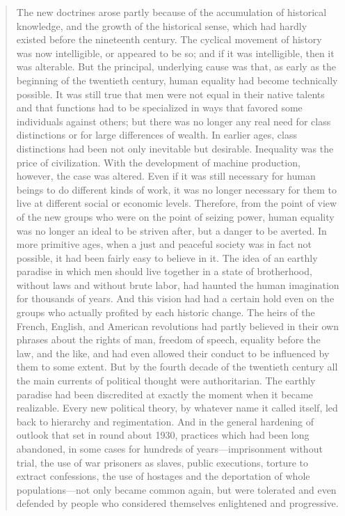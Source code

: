\begin{paracol}{2}
\begin{quotation}
The new doctrines arose partly because of the accumulation of historical
knowledge, and the growth of the historical sense, which had hardly
existed before the nineteenth century. The cyclical movement of history
was now intelligible, or appeared to be so; and if it was intelligible,
then it was alterable. But the principal, underlying cause was that, as
early as the beginning of the twentieth century, human equality had
become technically possible. It was still true that men were not equal
in their native talents and that functions had to be specialized in ways
that favored some individuals against others; but there was no longer
any real need for class distinctions or for large differences of wealth.
In earlier ages, class distinctions had been not only inevitable but
desirable. Inequality was the price of civilization. With the
development of machine production, however, the case was altered. Even
if it was still necessary for human beings to do different kinds of
work, it was no longer necessary for them to live at different social or
economic levels. Therefore, from the point of view of the new groups who
were on the point of seizing power, human equality was no longer an
ideal to be striven after, but a danger to be averted. In more primitive
ages, when a just and peaceful society was in fact not possible, it had
been fairly easy to believe in it. The idea of an earthly paradise in
which men should live together in a state of brotherhood, without laws
and without brute labor, had haunted the human imagination for thousands
of years. And this vision had had a certain hold even on the groups who
actually profited by each historic change. The heirs of the French,
English, and American revolutions had partly believed in their own
phrases about the rights of man, freedom of speech, equality before the
law, and the like, and had even allowed their conduct to be influenced
by them to some extent. But by the fourth decade of the twentieth
century all the main currents of political thought were authoritarian.
The earthly paradise had been discredited at exactly the moment when it
became realizable. Every new political theory, by whatever name it
called itself, led back to hierarchy and regimentation. And in the
general hardening of outlook that set in round about 1930, practices
which had been long abandoned, in some cases for hundreds of
years---imprisonment without trial, the use of war prisoners as slaves,
public executions, torture to extract confessions, the use of hostages
and the deportation of whole populations---not only became common again,
but were tolerated and even defended by people who considered themselves
enlightened and progressive.


\end{quotation}
\end{paracol}
